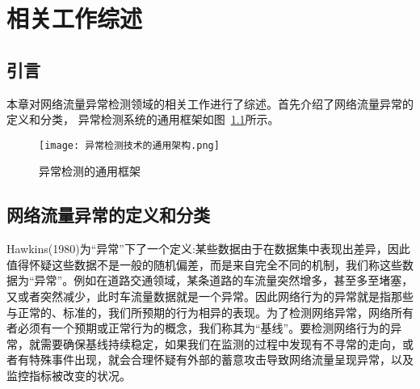 
\chapter{相关工作综述}

\section{引言}

本章对网络流量异常检测领域的相关工作进行了综述。首先介绍了网络流量异常的定义和分类，
异常检测系统的通用框架如图~\ref{fig:scheme}所示。






\begin{figure}
    \centering
    \texttt{[image: 异常检测技术的通用架构.png]}
    \caption{异常检测的通用框架}
    \label{fig:scheme}
  \end{figure}




\section{网络流量异常的定义和分类}
Hawkins(1980)\cite{hawkins1980identification}为“异常”下了一个定义:某些数据由于在数据集中表现出差异，因此值得怀疑这些数据不是一般的随机偏差，而是来自完全不同的机制，我们称这些数据为“异常”。例如在道路交通领域，某条道路的车流量突然增多，甚至多至堵塞，又或者突然减少，此时车流量数据就是一个异常。因此网络行为的异常就是指那些与正常的、标准的，我们所预期的行为相异的表现。为了检测网络异常，网络所有者必须有一个预期或正常行为的概念，我们称其为“基线”。要检测网络行为的异常，就需要确保基线持续稳定，如果我们在监测的过程中发现有不寻常的走向，或者有特殊事件出现，就会合理怀疑有外部的蓄意攻击导致网络流量呈现异常，以及监控指标被改变的状况。

